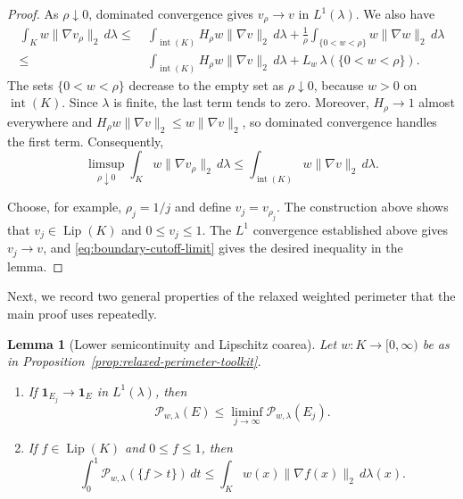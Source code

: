 \documentclass[11pt]{article}
\newtheorem{lemma}[theorem]{Lemma}
\theoremstyle{definition}
\theoremstyle{remark}
\newcommand{\Lip}{\operatorname{Lip}}
\begin{document}
\begin{proof}
As $\rho\downarrow0$, dominated convergence gives
$v_\rho\to v$ in $L^1(\lambda)$.  We also have
\begin{equation}\label{eq:boundary-cutoff-energy}
\begin{aligned}
 \int_K w\|\nabla v_\rho\|_2\,d\lambda
 \le &~ 
 \int_{\operatorname{int}(K)} H_\rho w\|\nabla v\|_2\,d\lambda
 +\frac1\rho
   \int_{\{0<w<\rho\}}w\|\nabla w\|_2\,d\lambda\\
 \le &~
 \int_{\operatorname{int}(K)} H_\rho w\|\nabla v\|_2\,d\lambda
 +L_w\,\lambda(\{0<w<\rho\}).
\end{aligned}
\end{equation}
The sets $\{0<w<\rho\}$ decrease to the empty set as $\rho\downarrow0$, because $w>0$ on ${\operatorname{int}(K)}$.  Since $\lambda$ is finite, the last term tends to zero.  Moreover, $H_\rho\to1$ almost everywhere and $H_\rho w\|\nabla v\|_2\le w\|\nabla v\|_2$, so dominated convergence handles the first term.  Consequently,
\begin{equation}\label{eq:boundary-cutoff-limit}
 \limsup_{\rho\downarrow0}
 \int_K w\|\nabla v_\rho\|_2\,d\lambda
 \le
 \int_{\operatorname{int}(K)} w\|\nabla v\|_2\,d\lambda.
\end{equation}

Choose, for example, $\rho_j=1/j$ and define $v_j=v_{\rho_j}$.  The construction above shows that $v_j\in\Lip(K)$ and $0\le v_j\le1$.  The $L^1$ convergence established above gives $v_j\to v$, and \eqref{eq:boundary-cutoff-limit} gives the desired inequality in the lemma.
\end{proof}

Next, we record two general properties of the relaxed weighted perimeter that the main proof uses repeatedly.
\begin{lemma}[Lower semicontinuity and Lipschitz coarea]
\label{lem:relaxed-lsc-coarea}
Let \(w:K\to[0,\infty)\) be as in
Proposition~\ref{prop:relaxed-perimeter-toolkit}.
\begin{enumerate}[label=\textup{(\alph*)}]
\item If $\mathbf1_{E_j}\rightarrow\mathbf1_E$ in $L^1(\lambda)$, then
\begin{equation}\label{eq:relaxed-lsc}
 \mathcal P_{w,\lambda}(E) \le \liminf_{j\to\infty}\mathcal P_{w,\lambda}(E_j).
\end{equation}

\item If \(f\in\operatorname{Lip}(K)\) and \(0\le f\le1\), then
\begin{equation}\label{eq:global-lipschitz-coarea}
 \int_0^1\mathcal P_{w,\lambda}(\{f>t\})\,dt
 \le
 \int_K w(x)\|\nabla f(x)\|_2\,d\lambda(x).
\end{equation}

\end{enumerate}
\end{lemma}
\end{document}
